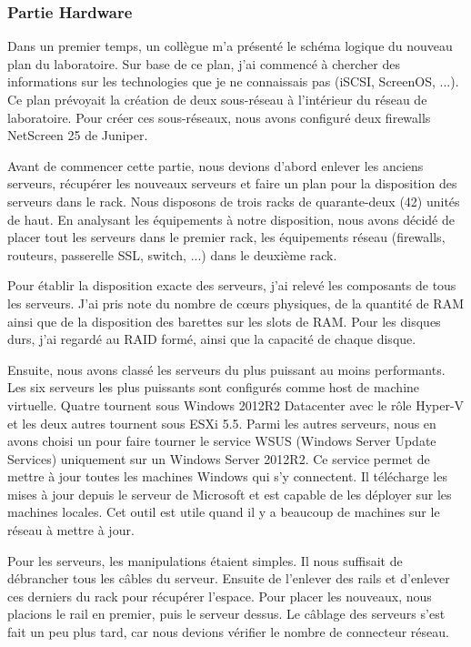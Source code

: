 \subsubsection{Partie Hardware}
Dans un premier temps, un collègue m'a présenté le schéma logique du nouveau plan du laboratoire.
Sur base de ce plan, j'ai commencé à chercher des informations sur les technologies que je ne connaissais pas (iSCSI, ScreenOS, ...).
Ce plan prévoyait la création de deux sous-réseau à l'intérieur du réseau de laboratoire.
Pour créer ces sous-réseaux, nous avons configuré deux firewalls NetScreen 25 de Juniper. 

Avant de commencer cette partie, nous devions d'abord enlever les anciens serveurs, récupérer les nouveaux serveurs et faire un plan pour la disposition des serveurs dans le rack.
Nous disposons de trois racks de quarante-deux (42) unités de haut. 
En analysant les équipements à notre disposition, nous avons décidé de placer tout les serveurs dans le premier rack, les équipements réseau (firewalls, routeurs, passerelle SSL, switch, ...) dans le deuxième rack. 

Pour établir la disposition exacte des serveurs, j'ai relevé les composants de tous les serveurs.
J'ai pris note du nombre de cœurs physiques, de la quantité de RAM ainsi que de la disposition des barettes sur les slots de RAM.
Pour les disques durs, j'ai regardé au RAID formé, ainsi que la capacité de chaque disque.

Ensuite, nous avons classé les serveurs du plus puissant au moins performants. 
Les six serveurs les plus puissants sont configurés comme host de machine virtuelle. 
Quatre tournent sous Windows 2012R2 Datacenter avec le rôle Hyper-V et les deux autres tournent sous ESXi 5.5.
Parmi les autres serveurs, nous en avons choisi un pour faire tourner le service WSUS (Windows Server Update Services) uniquement sur un Windows Server 2012R2. 
Ce service permet de mettre à jour toutes les machines Windows qui s'y connectent.
Il télécharge les mises à jour depuis le serveur de Microsoft et est capable de les déployer sur les machines locales.
Cet outil est utile quand il y a beaucoup de machines sur le réseau à mettre à jour. 

Pour les serveurs, les manipulations étaient simples. 
Il nous suffisait de débrancher tous les câbles du serveur.
Ensuite de l'enlever des rails et d'enlever ces derniers du rack pour récupérer l'espace.
Pour placer les nouveaux, nous placions le rail en premier, puis le serveur dessus.
Le câblage des serveurs s'est fait un peu plus tard, car nous devions vérifier le nombre de connecteur réseau. 

